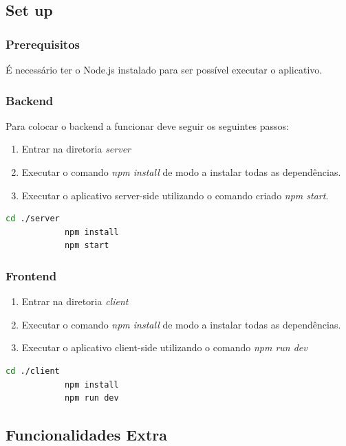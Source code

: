\documentclass{article}
\begin{document}
	\subsection{Set up}
	\subsubsection{Prerequisitos}
	É necessário ter o Node.js instalado para ser possível executar o aplicativo.
	\subsubsection{Backend}
	Para colocar o backend a funcionar deve seguir os seguintes passos:
	\begin{enumerate}
		\item Entrar na diretoria \textit{server}
		\item Executar o comando \textit{npm install} de modo a instalar todas as dependências.
		\item Executar o aplicativo server-side utilizando o comando criado \textit{npm start}.
	\end{enumerate}
	\begin{center}
		\begin{lstlisting}[language=bash,caption={Executar o Backend}]
			cd ./server
			npm install
			npm start
		\end{lstlisting}
	\end{center}
	
	
	\subsubsection{Frontend}
	\begin{enumerate}
		\item Entrar na diretoria \textit{client}
		\item Executar o comando \textit{npm install} de modo a instalar todas as dependências.
		\item Executar o aplicativo client-side utilizando o comando \textit{npm run dev}
	\end{enumerate}
	\begin{center}
		\begin{lstlisting}[language=bash,caption={Executar o Frontend}]
			cd ./client
			npm install
			npm run dev
		\end{lstlisting}
	\end{center}	
	\subsection{Funcionalidades Extra}
	
\end{document}

